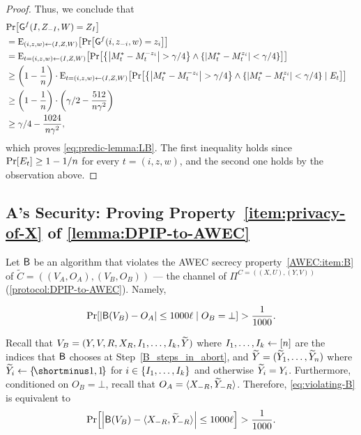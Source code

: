 {\begin{proof}
	Thus, we conclude that
	\begin{align*}
		\lefteqn{\pr{\Gc^f(I,Z_{-I},W) = Z_I}}\\
		&= \eex{(i,z,w) \la (I,Z,W)}{\pr{\Gc^f(i,z_{-i},w) = z_i}}\\
		&= \eex{t = (i,z,w) \la (I,Z,W)}{\pr{\set{\size{M_t^* - M_t^{-z_i}} > \gamma/4} \land \set{\size{M_t^* - M_t^{z_i}} < \gamma/4}}}\\
		&\geq \paren{1 - \frac1{n}}\cdot \eex{t = (i,z,w) \la (I,Z,W)}{\pr{\set{\size{M_t^* - M_t^{-z_i}} > \gamma/4} \land \set{\size{M_t^* - M_t^{z_i}} < \gamma/4} \mid E_t}}\\
		&\geq \paren{1 - \frac1{n}}\cdot \paren{\gamma/2 - \frac{512}{n \gamma^2}}\\
		&\geq \gamma/4 - \frac{1024}{n \gamma^2},
	\end{align*}
	which proves \cref{eq:predic-lemma:LB}. The first inequality holds since $\pr{E_t} \geq 1-1/n$ for every $t = (i,z,w)$, and the second one holds by the observation above.
	
\end{proof}
}

\subsection{A's Security: Proving Property~\ref{item:privacy-of-X} of \cref{lemma:DPIP-to-AWEC}}\label{sec:proving-prop2}

Let $\mathsf{B}$ be an algorithm that violates the AWEC secrecy property~\ref{AWEC:item:B} of $\tilde{C} = ((V_A,O_A),(V_B,O_B))$ --- the channel of $\Pi^{C = ((X,U),(Y,V))}$ (\cref{protocol:DPIP-to-AWEC}). Namely,

\begin{align}\label{eq:violating-B}
	\pr{\size{\Bc(V_B) - O_A} \leq 1000 \ell \mid O_B=\bot} > \frac1{1000}.
\end{align}

Recall that $V_B = (Y,V,R,X_{R},I_1,\ldots,I_k, \widetilde{Y})$ where $I_1,\ldots,I_k \gets [n]$ are the indices that $\mathsf{B}$ chooses at Step~\ref{B_steps_in_abort}, and $\widetilde{Y} = (\widetilde{Y}_1,\ldots,\widetilde{Y}_n)$ where $\tY_i \la \oo$ for $i \in \set{I_1,\ldots,I_k}$ and otherwise $\widetilde{Y}_i = Y_i$. Furthermore, conditioned on $O_B=\bot$, recall that $O_A = \langle X_{-R}, \widetilde{Y}_{-R} \rangle$. Therefore, \cref{eq:violating-B} is equivalent to 
\begin{align}\label{eq:Bc-guarantee}
	\pr{\size{\Bc(V_B) - \ip{X_{-R}, \tY_{-R}}} \leq 1000 \ell } > \frac1{1000}.
\end{align}


